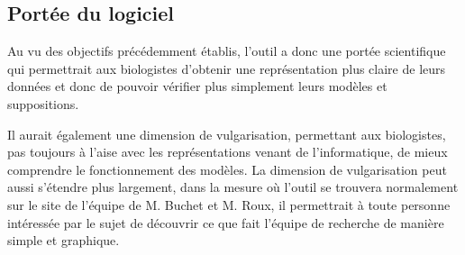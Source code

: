 \subsection{Portée du logiciel}
Au vu des objectifs précédemment établis, l'outil a donc une portée scientifique qui permettrait aux biologistes d'obtenir une représentation plus claire de leurs données et donc de pouvoir vérifier plus simplement leurs modèles et suppositions.
\newline

Il aurait également une dimension de vulgarisation, permettant aux biologistes, pas toujours à l'aise avec les représentations venant de l'informatique, de mieux comprendre le fonctionnement des modèles. La dimension de vulgarisation peut aussi s'étendre plus largement, dans la mesure où l'outil se trouvera normalement sur le site de l'équipe de M. Buchet et M. Roux, il permettrait à toute personne intéressée par le sujet de découvrir ce que fait l'équipe de recherche de manière simple et graphique.
